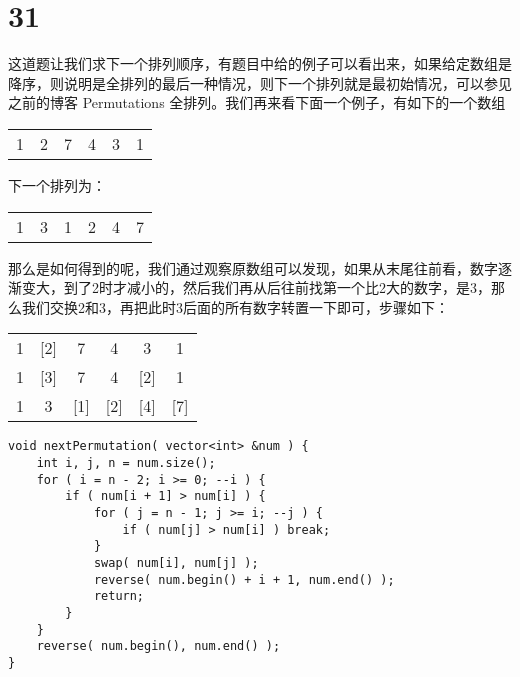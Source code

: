\documentclass[12pt,a4paper]{article}
\begin{document}
\section{31}
\begin{CJK}{UTF8}{gbsn}
这道题让我们求下一个排列顺序，有题目中给的例子可以看出来，如果给定数组是降序，则说明是全排列的最后一种情况，则下一个排列就是最初始情况，可以参见之前的博客 Permutations 全排列。我们再来看下面一个例子，有如下的一个数组
\end{CJK}
\begin{center}
\begin{tabular}{*{6}{c}}
1 & 2 & 7 & 4 & 3 & 1\\
\end{tabular}
\end{center}
\begin{CJK}{UTF8}{gbsn}
下一个排列为：
\end{CJK}
\begin{center}
\begin{tabular}{*{6}{c}}
1 & 3 & 1 & 2 & 4 & 7\\
\end{tabular}
\end{center}
\begin{CJK}{UTF8}{gbsn}
那么是如何得到的呢，我们通过观察原数组可以发现，如果从末尾往前看，数字逐渐变大，到了2时才减小的，然后我们再从后往前找第一个比2大的数字，是3，那么我们交换2和3，再把此时3后面的所有数字转置一下即可，步骤如下：
\end{CJK}
\begin{center}
\begin{tabular}{*{6}{c}}
1 & [2] & 7 & 4 & 3 & 1\\
1 & [3] & 7 & 4 & [2] & 1\\
1 & 3 & [1] & [2] & [4] & [7]\\
\end{tabular}
\end{center}
\begin{lstlisting}
void nextPermutation( vector<int> &num ) {
	int i, j, n = num.size();
	for ( i = n - 2; i >= 0; --i ) {
		if ( num[i + 1] > num[i] ) {
			for ( j = n - 1; j >= i; --j ) {
				if ( num[j] > num[i] ) break;
			}
			swap( num[i], num[j] );
			reverse( num.begin() + i + 1, num.end() );
			return;
		}
	}
	reverse( num.begin(), num.end() );
}
\end{lstlisting}
\end{document}
